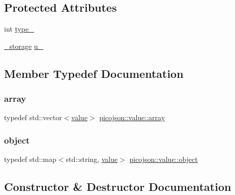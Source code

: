 \subsection*{Protected Attributes}
\begin{DoxyCompactItemize}
\item 
int \hyperlink{classpicojson_1_1value_af77ae4525a20f6fce6ea9ff1c4709312}{type\+\_\+}
\item 
\hyperlink{unionpicojson_1_1value_1_1__storage}{\+\_\+storage} \hyperlink{classpicojson_1_1value_aa7948fe10fcbc19ab9c8dee5e5099f77}{u\+\_\+}
\end{DoxyCompactItemize}


\subsection{Member Typedef Documentation}
\hypertarget{classpicojson_1_1value_adeff4fdf7ee5675eeb7686bb89233c43}{}\label{classpicojson_1_1value_adeff4fdf7ee5675eeb7686bb89233c43} 
\subsubsection{\texorpdfstring{array}{array}}
{\footnotesize\ttfamily typedef std\+::vector$<$\hyperlink{classpicojson_1_1value}{value}$>$ \hyperlink{classpicojson_1_1value_adeff4fdf7ee5675eeb7686bb89233c43}{picojson\+::value\+::array}}

\hypertarget{classpicojson_1_1value_a7d7da11d54d7b983a902d28367bda9c1}{}\label{classpicojson_1_1value_a7d7da11d54d7b983a902d28367bda9c1} 
\subsubsection{\texorpdfstring{object}{object}}
{\footnotesize\ttfamily typedef std\+::map$<$std\+::string, \hyperlink{classpicojson_1_1value}{value}$>$ \hyperlink{classpicojson_1_1value_a7d7da11d54d7b983a902d28367bda9c1}{picojson\+::value\+::object}}



\subsection{Constructor \& Destructor Documentation}
\hypertarget{classpicojson_1_1value_a445f8d1b335e7bcad6abd6c310b44c75}{}\label{classpicojson_1_1value_a445f8d1b335e7bcad6abd6c310b44c75} 
